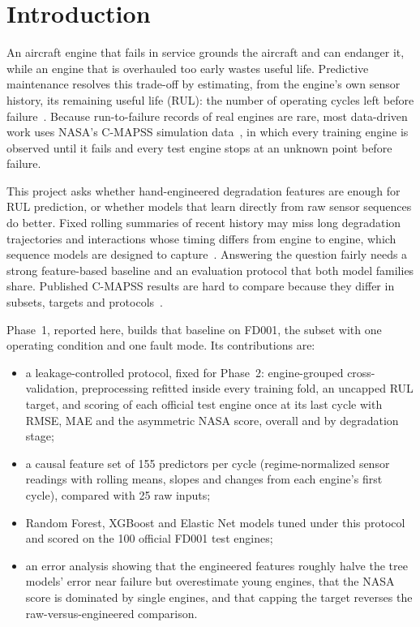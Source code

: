 
\section{Introduction}
\label{sec:introduction}

An aircraft engine that fails in service grounds the aircraft and can endanger it,
while an engine that is overhauled too early wastes useful life. Predictive
maintenance resolves this trade-off by estimating, from the engine's own sensor
history, its remaining useful life (RUL): the number of operating cycles left
before failure~\cite{Jardine2006review,Lei2018machinery}. Because run-to-failure
records of real engines are rare, most data-driven work uses NASA's C-MAPSS
simulation data~\cite{Saxena2008damage,Saxena2008turbofan}, in which every
training engine is observed until it fails and every test engine stops at an
unknown point before failure.

This project asks whether hand-engineered degradation features are enough for RUL
prediction, or whether models that learn directly from raw sensor sequences do
better. Fixed rolling summaries of recent history may miss long degradation
trajectories and interactions whose timing differs from engine to engine, which
sequence models are designed to capture~\cite{Zheng2017long}. Answering the
question fairly needs a strong feature-based baseline and an evaluation protocol
that both model families share. Published C-MAPSS results are hard to compare
because they differ in subsets, targets and protocols~\cite{Ramasso2014performance}.

Phase~1, reported here, builds that baseline on FD001, the subset with one
operating condition and one fault mode. Its contributions are:
\begin{itemize}
\item a leakage-controlled protocol, fixed for Phase~2: engine-grouped
  cross-validation, preprocessing refitted inside every training fold, an
  uncapped RUL target, and scoring of each official test engine once at its last
  cycle with RMSE, MAE and the asymmetric NASA score, overall and by degradation
  stage;
\item a causal feature set of 155 predictors per cycle (regime-normalized sensor
  readings with rolling means, slopes and changes from each engine's first
  cycle), compared with 25 raw inputs;
\item Random Forest, XGBoost and Elastic Net models tuned under this protocol and
  scored on the 100 official FD001 test engines;
\item an error analysis showing that the engineered features roughly halve the
  tree models' error near failure but overestimate young engines, that the NASA
  score is dominated by single engines, and that capping the target reverses the
  raw-versus-engineered comparison.
\end{itemize}

